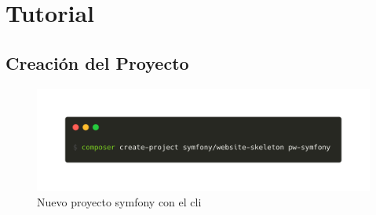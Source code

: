 \section{Tutorial}
\subsection{Creación del Proyecto}
\begin{figure}[ht]
  \centering
  \includegraphics[width=\textwidth]{../assets/composer_create_project.png}
  \caption{Nuevo proyecto symfony con el cli}
  \label{fig:composer_create_project}
\end{figure}